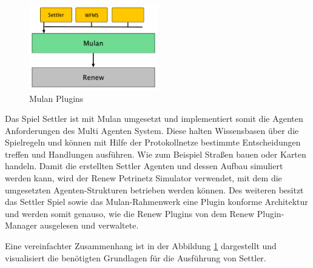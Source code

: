 	\begin{figure}[h!]
	  \centering
	  \includegraphics[width=0.5\textwidth]{material/images/settler-mulan-renew.pdf}
	  \caption{Mulan Plugins}
	  \label{fig:mulan_plugin}
	\end{figure}

	Das Spiel Settler ist mit Mulan umgesetzt und implementiert somit die Agenten Anforderungen des Multi Agenten System. Diese halten Wissensbasen über die Spielregeln und können mit Hilfe der Protokollnetze bestimmte Entscheidungen treffen und Handlungen ausführen. Wie zum Beispiel Straßen bauen oder Karten handeln.\newline
	Damit die erstellten Settler Agenten und dessen Aufbau simuliert werden kann, wird der Renew Petrinetz Simulator verwendet, mit dem die umgesetzten Agenten-Strukturen betrieben werden können.\newline
	Des weiteren besitzt das Settler Spiel sowie das Mulan-Rahmenwerk eine Plugin konforme Architektur und werden somit genauso, wie die Renew Plugins von dem Renew Plugin-Manager ausgelesen und verwaltete.\bigbreak

	Eine vereinfachter Zusammenhang ist in der Abbildung \ref{fig:mulan_plugin} dargestellt und visualisiert die benötigten Grundlagen für die Ausführung von Settler.
